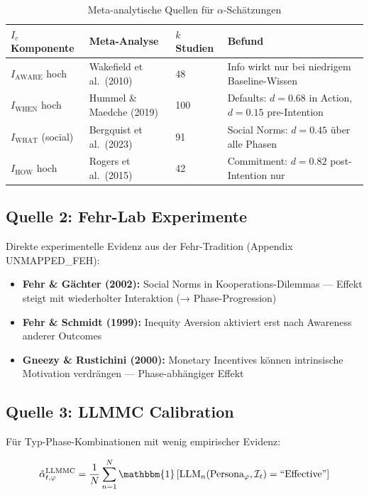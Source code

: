 \begin{table}[htbp]
\centering
\caption{Meta-analytische Quellen für $\alpha$-Schätzungen}
\label{tab:18-meta-sources}
\renewcommand{\arraystretch}{1.3}
\small
\begin{tabular}{@{}llll@{}}
\toprule
\textbf{$I_c$ Komponente} & \textbf{Meta-Analyse} & \textbf{$k$ Studien} & \textbf{Befund} \\
\midrule
$I_{\text{AWARE}}$ hoch & Wakefield et al.\ (2010) & 48 & Info wirkt nur bei niedrigem Baseline-Wissen \\
$I_{\text{WHEN}}$ hoch & Hummel \& Maedche (2019) & 100 & Defaults: $d = 0.68$ in Action, $d = 0.15$ pre-Intention \\
$I_{\text{WHAT}}$ (social) & Bergquist et al.\ (2023) & 91 & Social Norms: $d = 0.45$ \"{u}ber alle Phasen \\
$I_{\text{HOW}}$ hoch & Rogers et al.\ (2015) & 42 & Commitment: $d = 0.82$ post-Intention nur \\
\bottomrule
\end{tabular}
\end{table}

\subsection{Quelle 2: Fehr-Lab Experimente}

Direkte experimentelle Evidenz aus der Fehr-Tradition (Appendix UNMAPPED_FEH):

\begin{itemize}
\item \textbf{Fehr \& Gächter (2002):} Social Norms in Kooperations-Dilemmas --- Effekt steigt mit wiederholter Interaktion (→ Phase-Progression)
\item \textbf{Fehr \& Schmidt (1999):} Inequity Aversion aktiviert erst nach Awareness anderer Outcomes
\item \textbf{Gneezy \& Rustichini (2000):} Monetary Incentives können intrinsische Motivation verdrängen --- Phase-abhängiger Effekt
\end{itemize}

\subsection{Quelle 3: LLMMC Calibration}

Für Typ-Phase-Kombinationen mit wenig empirischer Evidenz:

\begin{equation}
\hat{\alpha}_{t,\varphi}^{\text{LLMMC}} = \frac{1}{N} \sum_{n=1}^{N} \mathbbm{1}\left[ \text{LLM}_n(\text{Persona}_\varphi, \mathcal{I}_t) = \text{``Effective''} \right]
\label{eq:18-llmmc-alpha}
\end{equation}

